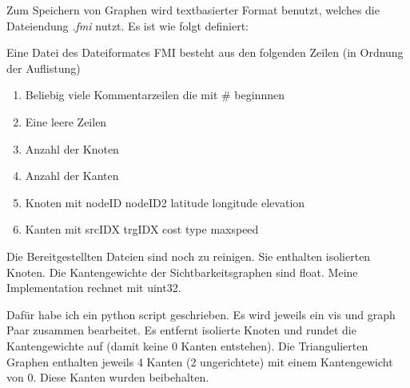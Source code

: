 Zum Speichern von Graphen wird textbasierter Format benutzt, welches die Dateiendung \emph{.fmi} nutzt.
Es ist wie folgt definiert:
\begin{definition}
    Eine Datei des Dateiformates FMI besteht aus den folgenden Zeilen (in Ordnung der Auflistung)
    \begin{enumerate}
        \item
              Beliebig viele Kommentarzeilen die mit \# beginnnen

        \item
              Eine leere Zeilen

        \item
              Anzahl der Knoten

        \item
              Anzahl der Kanten

        \item
              Knoten mit nodeID nodeID2 latitude longitude elevation

        \item
              Kanten mit srcIDX trgIDX cost type maxspeed
    \end{enumerate}
\end{definition}

Die Bereitgestellten Dateien sind noch zu reinigen.
Sie enthalten isolierten Knoten.
Die Kantengewichte der Sichtbarkeitsgraphen sind float.
Meine Implementation rechnet mit uint32.

Dafür habe ich ein python script geschrieben.
Es wird jeweils ein vis und graph Paar zusammen bearbeitet.
Es entfernt isolierte Knoten und rundet die Kantengewichte auf (damit keine 0 Kanten entstehen).
Die Triangulierten Graphen enthalten jeweils 4 Kanten (2 ungerichtete) mit einem Kantengewicht von 0.
Diese Kanten wurden beibehalten.

